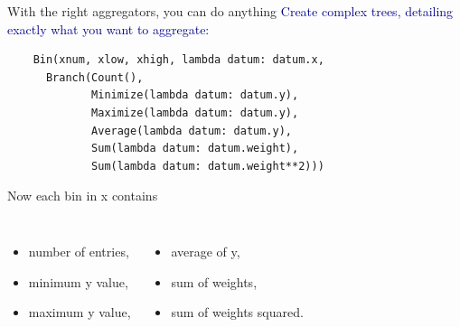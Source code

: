 \documentclass[aspectratio=169]{beamer}
\begin{document}




\begin{frame}[fragile]{With the right aggregators, you can do anything}
\vspace{0.75 cm}
\small
\textcolor{darkblue}{\normalsize Create complex trees, detailing exactly what you want to aggregate:}
\begin{verbatim}
    Bin(xnum, xlow, xhigh, lambda datum: datum.x,
      Branch(Count(),
             Minimize(lambda datum: datum.y),
             Maximize(lambda datum: datum.y),
             Average(lambda datum: datum.y),
             Sum(lambda datum: datum.weight),
             Sum(lambda datum: datum.weight**2)))
\end{verbatim}

\vspace{0.25 cm}
\begin{center}
\begin{minipage}{0.8\linewidth}
Now each bin in {\ttfamily\small x} contains
\begin{columns}
\begin{itemize}
\item number of entries,
\item minimum {\ttfamily\small y} value,
\item maximum {\ttfamily\small y} value,
\end{itemize}

\begin{itemize}
\item average of {\ttfamily\small y},
\item sum of weights,
\item sum of weights squared.
\end{itemize}
\end{columns}

\end{minipage}
\end{center}
\end{frame}
\end{document}
